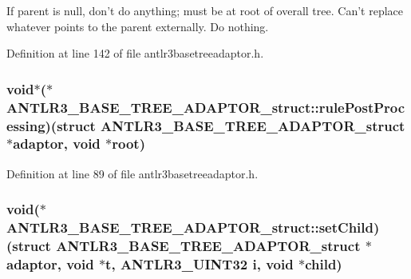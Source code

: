 If parent is null, don't do anything; must be at root of overall tree. Can't replace whatever points to the parent externally. Do nothing. 

Definition at line 142 of file antlr3basetreeadaptor.\-h.

\hypertarget{struct_a_n_t_l_r3___b_a_s_e___t_r_e_e___a_d_a_p_t_o_r__struct_ab6be897e50433fd8ceec35994a62db62}{
\subsubsection[{rule\-Post\-Processing}]{\setlength{\rightskip}{0pt plus 5cm}void$\ast$($\ast$ A\-N\-T\-L\-R3\-\_\-\-B\-A\-S\-E\-\_\-\-T\-R\-E\-E\-\_\-\-A\-D\-A\-P\-T\-O\-R\-\_\-struct\-::rule\-Post\-Processing)(struct {\bf A\-N\-T\-L\-R3\-\_\-\-B\-A\-S\-E\-\_\-\-T\-R\-E\-E\-\_\-\-A\-D\-A\-P\-T\-O\-R\-\_\-struct} $\ast$adaptor, void $\ast$root)}}\label{struct_a_n_t_l_r3___b_a_s_e___t_r_e_e___a_d_a_p_t_o_r__struct_ab6be897e50433fd8ceec35994a62db62}


Definition at line 89 of file antlr3basetreeadaptor.\-h.

\hypertarget{struct_a_n_t_l_r3___b_a_s_e___t_r_e_e___a_d_a_p_t_o_r__struct_a849847db53d270a9d299957ed38ef32b}{
\subsubsection[{set\-Child}]{\setlength{\rightskip}{0pt plus 5cm}void($\ast$ A\-N\-T\-L\-R3\-\_\-\-B\-A\-S\-E\-\_\-\-T\-R\-E\-E\-\_\-\-A\-D\-A\-P\-T\-O\-R\-\_\-struct\-::set\-Child)(struct {\bf A\-N\-T\-L\-R3\-\_\-\-B\-A\-S\-E\-\_\-\-T\-R\-E\-E\-\_\-\-A\-D\-A\-P\-T\-O\-R\-\_\-struct} $\ast$adaptor, void $\ast${\bf t}, {\bf A\-N\-T\-L\-R3\-\_\-\-U\-I\-N\-T32} {\bf i}, void $\ast$child)}}\label{struct_a_n_t_l_r3___b_a_s_e___t_r_e_e___a_d_a_p_t_o_r__struct_a849847db53d270a9d299957ed38ef32b}


